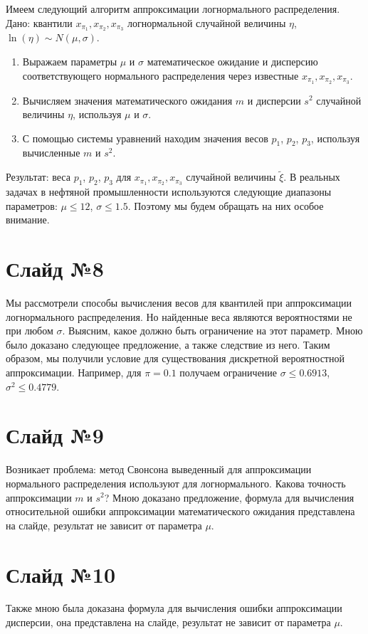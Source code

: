\documentclass[specialist, substylefile = spbu.rtx,
subf,href,colorlinks=true, 12pt]{disser}
\begin{document}
Имеем следующий алгоритм аппроксимации логнормального распределения. Дано: квантили $x_{\pi_{1}}, x_{\pi_{2}}, x_{\pi_{3}}$ логнормальной случайной величины $\eta$, $\ln(\eta) \sim N(\mu, \sigma)$.
\begin{enumerate}
	\item Выражаем параметры $\mu$ и $\sigma$ математическое ожидание и дисперсию соответствующего нормального распределения через известные $x_{\pi_{1}}, x_{\pi_{2}}, x_{\pi_{3}}$. 
	\item Вычисляем значения математического ожидания $m$ и дисперсии $s^{2}$ случайной величины $\eta$, используя $\mu$ и $\sigma$.
	\item С помощью системы уравнений находим значения весов $p_{1}$, $p_{2}$, $p_{3}$, используя вычисленные $m$ и $s^{2}$.
\end{enumerate}
Результат: веса $p_{1}$, $p_{2}$, $p_{3}$ для $x_{\pi_{1}}, x_{\pi_{2}}, x_{\pi_{3}}$ случайной величины $\tilde{\xi}$. В реальных задачах в нефтяной промышленности используются следующие диапазоны параметров:
$\mu\leq12$, $\sigma\leq1.5$. Поэтому мы будем обращать на них особое внимание.

\section*{Слайд №8}
	Мы рассмотрели способы вычисления весов для квантилей при аппроксимации логнормального распределения. Но найденные веса являются вероятностями не при любом $\sigma$. Выясним, какое должно быть ограничение на этот параметр. Мною было доказано следующее предложение, а также следствие из него. Таким образом, мы получили условие для существования дискретной вероятностной аппроксимации. Например, для $\pi=0.1$ получаем ограничение $\sigma\leq 0.6913$, $\sigma^{2}\leq 0.4779$.
	
\section*{Слайд №9}

Возникает проблема: метод Свонсона выведенный для аппроксимации нормального распределения используют для логнормального. Какова точность аппроксимации $m$ и $s^{2}$? Мною доказано предложение, формула для вычисления относительной ошибки аппроксимации математического ожидания представлена на слайде, результат не зависит от параметра $\mu$.

\section*{Слайд №10}
Также мною была доказана формула для вычисления ошибки аппроксимации дисперсии, она представлена на слайде, результат не зависит от параметра $\mu$.
\end{document}
